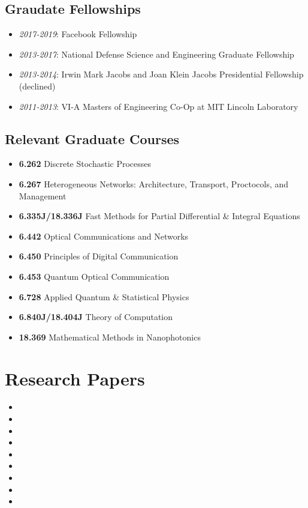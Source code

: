 \documentclass[letterpaper,12pt]{article}
\begin{document}
\subsection{Graudate Fellowships}
\begin{itemize}
\item \emph{2017-2019}: Facebook Fellowship
\item \emph{2013-2017}: National Defense Science and Engineering Graduate Fellowship
\item \emph{2013-2014}: Irwin Mark Jacobs and Joan Klein Jacobs Presidential Fellowship (declined)
\item \emph{2011-2013}: VI-A Masters of Engineering Co-Op at MIT Lincoln Laboratory 
\end{itemize}

\subsection{Relevant Graduate Courses}

\begin{itemize}

\item \textbf{6.262} Discrete Stochastic Processes
\item \textbf{6.267} Heterogeneous Networks: Architecture, Transport, Proctocols, and Management
\item \textbf{6.335J/18.336J} Fast Methods for Partial Differential \& Integral Equations
\item \textbf{6.442} Optical Communications and Networks
\item \textbf{6.450} Principles of Digital Communication
\item \textbf{6.453} Quantum Optical Communication
\item \textbf{6.728} Applied Quantum \& Statistical Physics
\item \textbf{6.840J/18.404J} Theory of Computation 
\item \textbf{18.369} Mathematical Methods in Nanophotonics

\end{itemize}

\section{Research Papers}

\begin{itemize}
\item {}
\item {}
\item {}
\item {}
\item {}
\item {}
\item {}
\item {}
\item {}
\end{itemize}
\end{document}
